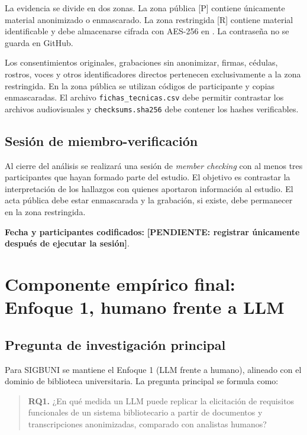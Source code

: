 \documentclass[12pt,journal,onecolumn]{IEEEtran}
\newcommand{\pendiente}[1]{\textcolor{red!70!black}{\textbf{[PENDIENTE: #1]}}}
\begin{document}
La evidencia se divide en dos zonas. La zona pública [P] contiene únicamente
material anonimizado o enmascarado. La zona restringida [R] contiene material
identificable y debe almacenarse cifrada con AES-256 en
. La contraseña no se guarda en GitHub.

Los consentimientos originales, grabaciones sin anonimizar, firmas, cédulas,
rostros, voces y otros identificadores directos pertenecen exclusivamente a la
zona restringida. En la zona pública se utilizan códigos de participante y
copias enmascaradas. El archivo \texttt{fichas\_tecnicas.csv} debe permitir
contrastar los archivos audiovisuales y \texttt{checksums.sha256} debe
contener los hashes verificables.

\subsection{Sesión de miembro-verificación}

Al cierre del análisis se realizará una sesión de \emph{member checking} con
al menos tres participantes que hayan formado parte del estudio. El objetivo
es contrastar la interpretación de los hallazgos con quienes aportaron
información al estudio. El acta pública debe estar enmascarada y la grabación,
si existe, debe permanecer en la zona restringida.

\textbf{Fecha y participantes codificados:}
\pendiente{registrar únicamente después de ejecutar la sesión}.

\section{Componente empírico final: Enfoque 1, humano frente a LLM}
\label{sec:experimento_final}

\subsection{Pregunta de investigación principal}

Para SIGBUNI se mantiene el Enfoque 1 (LLM frente a humano), alineado con el
dominio de biblioteca universitaria. La pregunta principal se formula como:

\begin{quote}
\textbf{RQ1.} ¿En qué medida un LLM puede replicar la elicitación de requisitos
funcionales de un sistema bibliotecario a partir de documentos y transcripciones
anonimizadas, comparado con analistas humanos?
\end{quote}
\end{document}
